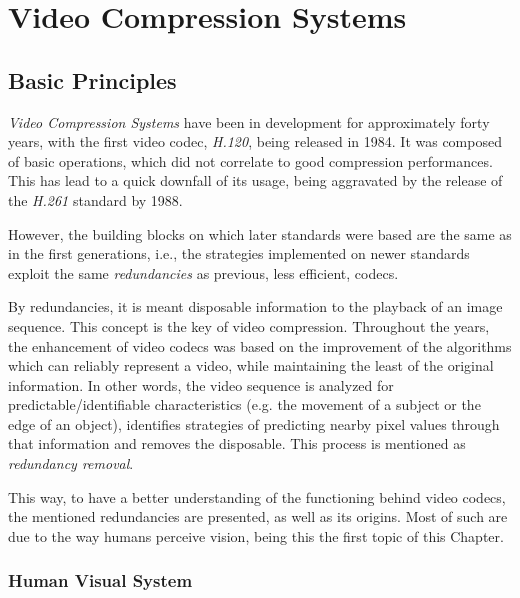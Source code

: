\cleardoublepage
\chapter{Video Compression Systems}\label{chap:av1}

\section{Basic Principles}

\emph{Video Compression Systems} have been in development for approximately forty years, with the first video codec, \emph{H.120}, being released in 1984. It was composed of basic operations, which did not correlate to good compression performances. This has lead to a quick downfall of its usage, being aggravated by the release of the \emph{H.261} standard by 1988.

However, the building blocks on which later standards were based are the same as in the first generations, i.e., the strategies implemented on newer standards exploit the same \emph{redundancies} as previous, less efficient, codecs.

By redundancies, it is meant disposable information to the playback of an image sequence. This concept is the key of video compression. Throughout the years, the enhancement of video codecs was based on the improvement of the algorithms which can reliably represent a video, while maintaining the least of the original information. In other words, the video sequence is analyzed for predictable/identifiable characteristics (e.g. the movement of a subject or the edge of an object), identifies strategies of predicting nearby pixel values through that information and removes the disposable. This process is mentioned as \emph{redundancy removal}.

This way, to have a better understanding of the functioning behind video codecs, the mentioned redundancies are presented, as well as its origins. Most of such are due to the way humans perceive vision, being this the first topic of this Chapter.

\subsection{Human Visual System} \label{ssec:hvs}


